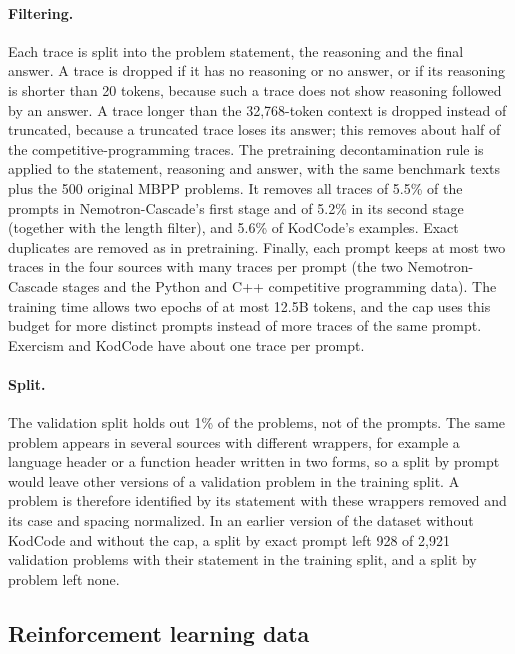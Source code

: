 \documentclass[sigconf,nonacm,balance=false]{acmart}
\begin{document}
\paragraph{Filtering.} Each trace is split into the problem statement, the reasoning and the final answer. A trace is
dropped if it has no reasoning or no answer, or if its reasoning is shorter than 20 tokens, because such a trace does
not show reasoning followed by an answer. A trace longer than the 32,768-token context is dropped instead of
truncated, because a truncated trace loses its answer; this removes about half of the competitive-programming traces.
The pretraining decontamination rule is applied to the statement, reasoning and answer, with the same benchmark texts
plus the 500 original MBPP problems. It removes all traces of 5.5\% of the prompts in Nemotron-Cascade's first stage
and of 5.2\% in its second stage (together with the length filter), and 5.6\% of KodCode's examples. Exact duplicates
are removed as in pretraining. Finally, each prompt keeps at most two traces in the four sources with many traces per
prompt (the two Nemotron-Cascade stages and the Python and C++ competitive programming data). The training time allows
two epochs of at most 12.5B tokens, and the cap uses this budget for more distinct prompts instead of more traces of
the same prompt. Exercism and KodCode have about one trace per prompt.

\paragraph{Split.} The validation split holds out 1\% of the problems, not of the prompts. The same problem appears in
several sources with different wrappers, for example a language header or a function header written in two forms, so
a split by prompt would leave other versions of a validation problem in the training split. A problem is therefore
identified by its statement with these wrappers removed and its case and spacing normalized. In an earlier version of
the dataset without KodCode and without the cap, a split by exact prompt left 928 of 2,921 validation problems with
their statement in the training split, and a split by problem left none.

\subsection{Reinforcement learning data}
\label{sec:data-rl}
\end{document}
